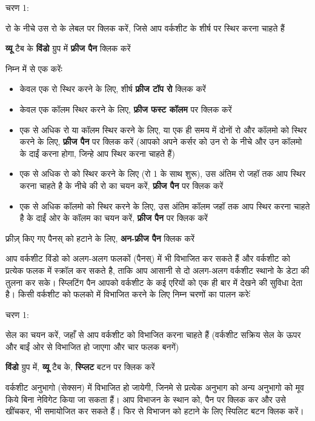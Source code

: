 \begin{descriptionSimple}{चरण 1:}
\item[चरण 1] रो के नीचे उस रो के लेबल पर क्लिक करें, जिसे आप वर्कशीट के शीर्ष पर स्थिर करना चाहते हैं
\item[चरण 2] \textbf{व्यू} टैब के \textbf{विंडो} ग्रुप में \textbf{फ्रीज पैन} क्लिक करें
\item[चरण 3] निम्न में से एक करेंः
		\begin{itemize}
		\item केवल एक रो स्थिर करने के लिए, शीर्ष \textbf{फ्रीज टॉप रो} क्लिक करें
		\item केवल एक कॉलम स्थिर करने के लिए, \textbf{फ्रीज फस्ट कॉलम} पर क्लिक करें
		\item एक से अधिक रो या कॉलम स्थिर करने के लिए, या एक ही समय में दोनों रो और कॉलमो को स्थिर करने के लिए, \textbf{फ्रीज पैन} पर क्लिक करें (आपको अपने कर्सर को उन रो के नीचे और उन कॉलमो के दाईं करना होगा, जिन्हे आप स्थिर करना चाहते हैं)
		\item एक से अधिक रो को स्थिर करने के लिए (रो 1 के साथ शुरू), उस अंतिम रो जहॉ तक आप स्थिर करना चाहते है के नीचे की रो का चयन करें, \textbf{फ्रीज पैन} पर क्लिक करें
		\item एक से अधिक कॉलमो को स्थिर करने के लिए, उस अंतिम कॉलम जहॉ तक आप स्थिर करना चाहते है के दाईं ओर के कॉलम का चयन करें, \textbf{फ्रीज पैन} पर क्लिक करें
		\end{itemize}
\item[चरण 4] फ्रीज़् किए गए पैनस् को हटाने के लिए, \textbf{अन-फ्रीज पैन} क्लिक करें
\end{descriptionSimple}

आप वर्कशीट विंडो को अलग-अलग फलकों (पैनस्) में भी विभाजित कर सकते हैं और वर्कशीट को प्रत्येक फलक में स्क्रॉल कर सकते है, ताकि आप आसानी से दो अलग-अलग वर्कशीट स्थानो केे डेटा की तुलना कर सके। स्प्लिटिंग पैन आपको वर्कशीट के कई एरियों को एक ही बार में देखने की सुविधा देता है। किसी वर्कशीट को फलको में विभाजित करने के लिए निम्न चरणों का पालन करेःं

\begin{descriptionSimple}{चरण 1:}
\item[चरण 1] सेल का चयन करें, जहाँ से आप वर्कशीट को विभाजित करना चाहते हैं (वर्कशीट सक्रिय सेल के ऊपर और बाईं ओर से विभाजित हो जाएगा और चार फलक बनगें)
\item[चरण 2] \textbf{विंडो} ग्रुप  में, \textbf{व्यू} टैब के, \textbf{स्प्लिट} बटन पर क्लिक करें
\end{descriptionSimple}

वर्कशीट अनुभागो (सेक्सन) में विभाजित हो जायेगी, जिनमे से प्रत्येक अनुभाग को अन्य अनुभागो को मूव किये बिना नेविगेट किया जा सकता हैं। आप विभाजन के स्थान को, पैन पर क्लिक कर और उसे खींचकर, भी समायोजित कर सकते हैं। फिर से विभाजन को हटाने के लिए स्पिलिट बटन क्लिक करें।

